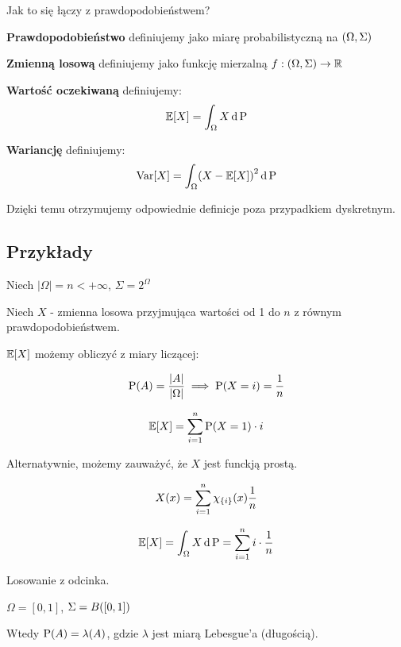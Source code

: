 \begin{corollary}

    Jak to się łączy z prawdopodobieństwem?

    \textbf{Prawdopodobieństwo} definiujemy jako miarę probabilistyczną na \( \left( \Omega, \Sigma \right) \)

    \textbf{Zmienną losową} definiujemy jako funkcję mierzalną \( f: \left( \Omega, \Sigma \right) \to \mathbb{R} \)

    \textbf{Wartość oczekiwaną} definiujemy:
    \[
        \expected{X} = \int_{\Omega} X \diff \prob
    \]

    \textbf{Wariancję} definiujemy:
    \[
        \variance{X} = \int_{\Omega} \pars{ X - \expected{X} }^2 \diff \prob
    \]

    Dzięki temu otrzymujemy odpowiednie definicje poza przypadkiem dyskretnym.
\end{corollary}

\subsection{Przykłady}

\begin{example}

    Niech \( \left| \Omega \right| = n < +\infty \), \( \Sigma = 2^{\Omega} \)

    Niech \( X \) - zmienna losowa przyjmująca wartości od 1 do \( n \) z równym prawdopodobieństwem.

    \( \expected{X} \) możemy obliczyć z miary liczącej:

    \[ 
        \prob \pars{ A } = \frac{ \left| A \right| }{ \left| \Omega \right| } \implies \prob \pars{ X = i } = \frac{1}{n} 
    \]

    \[ 
        \expected{X} = \sum_{i = 1}^{n} \prob \pars{ X = 1 } \cdot i 
    \]

    Alternatywnie, możemy zauważyć, że \( X \) jest funckją prostą.

    \[ 
        X \pars{ x } = \sum_{i = 1}^{n} \chi_{\set{ i }}\pars{ x } \frac{1}{n} 
    \]

    \[ 
        \expected{X} = \int_{\Omega} X \diff \prob = \sum_{i=1}^{n} i \cdot \frac{1}{n} 
    \]

\end{example}

\begin{example}
    Losowanie z odcinka.

    \( \Omega = [ 0, 1] \), \( \Sigma = B\pars{[0, 1] } \)

    Wtedy \( \operatorname{P}(A) = \lambda(A) \), gdzie \( \lambda \) jest miarą Lebesgue'a (długością).
    
\end{example}

